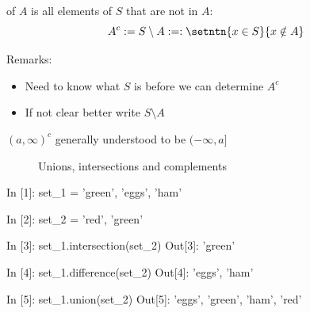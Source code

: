 \begin{frame}
    
     of $A$ is all elements of $S$ that are not in $A$:
    \begin{equation*}
        A^c := S \setminus A :=: \setntn{x \in S}{x \notin A}
    \end{equation*}

    \vspace{1em}

    Remarks: 
    
    \begin{itemize}
        \item Need to know what $S$ is before we can determine $A^c$
        \item If not clear better write $S \setminus A$
    \end{itemize}

    \vspace{1em}

    \Eg $(a,\infty)^c$ generally understood to be $(-\infty, a]$ 

\end{frame}


\begin{frame}
    
    \begin{figure}
       \begin{center}
        \caption{\label{f:allsets} Unions, intersections and complements}
       \end{center}
    \end{figure}
    
\end{frame}


\begin{frame}[fragile]


    \begin{pythoncode}
In [1]: set_1 = {'green', 'eggs', 'ham'}

In [2]: set_2 = {'red', 'green'}

In [3]: set_1.intersection(set_2)
Out[3]: {'green'}

In [4]: set_1.difference(set_2)
Out[4]: {'eggs', 'ham'}

In [5]: set_1.union(set_2)
Out[5]: {'eggs', 'green', 'ham', 'red'}
    \end{pythoncode}

\end{frame}




